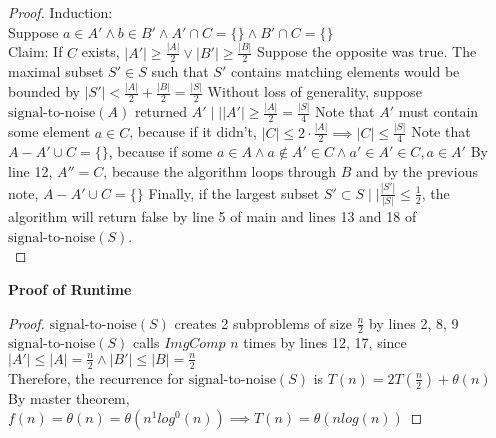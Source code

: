 \begin{problem}
\begin{proof}
    Induction: \\
    Suppose $a \in A' \land b \in B' \land A' \cap C = \{\} \land B' \cap C = \{\}$ \\
    Claim: If $C$ exists, $|A'| \geq \frac{|A|}{2} \lor |B'| \geq \frac{|B|}{2}$
    Suppose the opposite was true. The maximal subset $S' \in S$ such that $S'$ contains matching elements would be bounded by $|S'| < \frac{|A|}{2} + \frac{|B|}{2} = \frac{|S|}{2}$
    Without loss of generality, suppose $\text{signal-to-noise}(A)$ returned $A' \mid| |A'| \geq \frac{|A|}{2} = \frac{|S|}{4}$
    Note that $A'$ must contain some element $a \in C$, because if it didn't, $|C| \leq 2 \cdot \frac{|A|}{2} \implies |C| \leq \frac{|S|}{4}$
    Note that $A - A' \cup C = \{\}$, because if some $a \in A \land a \not\in A' \in C \land a' \in A' \in C, a \in A'$
    By line 12, $A'' = C$, because the algorithm loops through $B$ and by the previous note, $A - A' \cup C = \{\}$
    Finally, if the largest subset $S' \subset S \mid| \frac{|S'|}{|S|} \leq \frac{1}{2}$, the algorithm will return false by line 5 of main and lines 13 and 18 of $\text{signal-to-noise}(S)$. \\
  \end{proof}
  \noindent
  \textbf{Proof of Runtime}
  \begin{proof}
    $\text{signal-to-noise}(S)$ creates 2 subproblems of size $\frac{n}{2}$ by lines 2, 8, 9 \\
    $\text{signal-to-noise}(S)$ calls $ImgComp$ $n$ times by lines 12, 17, since $|A'| \leq |A| = \frac{n}{2} \land |B'| \leq |B| = \frac{n}{2}$\\
    Therefore, the recurrence for $\text{signal-to-noise}(S)$ is $T(n) = 2T(\frac{n}{2}) + \theta(n)$
    By master theorem, $f(n) = \theta(n) = \theta(n^1log^0(n)) \implies T(n) = \theta(nlog(n))$
  \end{proof}
\end{problem}
